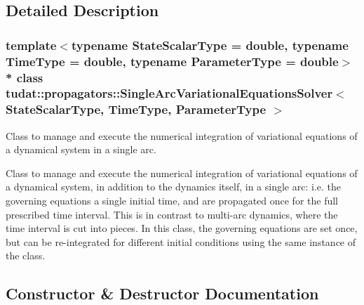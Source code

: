 \subsection{Detailed Description}
\subsubsection*{template$<$typename State\+Scalar\+Type = double, typename Time\+Type = double, typename Parameter\+Type = double$>$\\*
class tudat\+::propagators\+::\+Single\+Arc\+Variational\+Equations\+Solver$<$ State\+Scalar\+Type, Time\+Type, Parameter\+Type $>$}

Class to manage and execute the numerical integration of variational equations of a dynamical system in a single arc. 

Class to manage and execute the numerical integration of variational equations of a dynamical system, in addition to the dynamics itself, in a single arc\+: i.\+e. the governing equations a single initial time, and are propagated once for the full prescribed time interval. This is in contrast to multi-\/arc dynamics, where the time interval is cut into pieces. In this class, the governing equations are set once, but can be re-\/integrated for different initial conditions using the same instance of the class. 

\subsection{Constructor \& Destructor Documentation}
